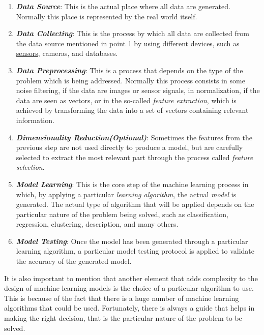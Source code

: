 \begin{enumerate}
      \item \emph{\textbf{Data Source}}: This is the actual place where
            all data are generated. Normally this place is represented
            by the real world itself.
      \item \emph{\textbf{Data Collecting}}: This is the process by which
            all data are collected from the data source mentioned in
            point 1 by using different devices, such as
            \underline{sensors}, cameras, and databases.
      \item \emph{\textbf{Data Preprocessing}}: This is a process that
            depends on the type of the problem which is being addressed.
            Normally this process consists in some noise filtering, if the
            data are images or sensor signals, in normalization,
            if the data are seen as vectors, or in the
            so-called \emph{feature extraction}, which is achieved by
            transforming the data into a set of vectors containing relevant
            information.
      \item \emph{\textbf{Dimensionality Reduction(Optional)}}: Sometimes
            the features from the previous step are not used directly to
            produce a model, but are carefully selected to extract
            the most relevant part through the process called \emph{feature selection}.
      \item \emph{\textbf{Model Learning}}: This is the core step of the
            machine learning process in which, by applying a particular
            \emph{learning algorithm}, the actual \emph{model}
            is generated. The actual type of algorithm that will be
            applied depends on the particular nature of the problem being
            solved, such as classification, regression, clustering,
            description, and many others.
      \item \emph{\textbf{Model Testing}}: Once the model has been
            generated through a particular learning algorithm, a
            particular model testing protocol is applied to validate
            the accuracy of the generated model.
\end{enumerate}

It is also important to mention that another element that adds complexity
to the design of machine learning models is the choice of a particular
algorithm to use. This is because of the fact that there is a huge number
of machine learning algorithms that could be used. Fortunately, there is
always a guide that helps in making the right decision, that is the
particular nature of the problem to be solved.

